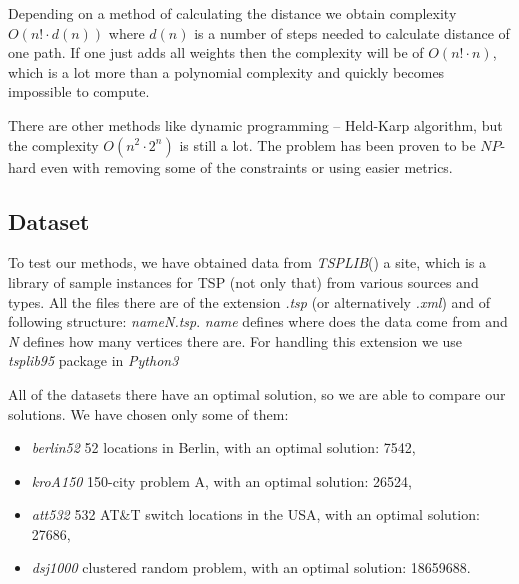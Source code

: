 	Depending on a method of calculating the distance we obtain complexity $O(n! \cdot d(n))$ where $d(n)$ is a number of steps needed to calculate distance of one path. If one just adds all weights then the complexity will be of $O(n! \cdot n)$, which is a lot more than a polynomial complexity and quickly becomes impossible to compute.
	
	There are other methods like dynamic programming -- Held-Karp algorithm, but the complexity $O(n^2 \cdot 2^n)$ is still a lot. The problem has been proven to be $NP$-hard even with removing some of the constraints or using easier metrics.

\subsection{Dataset}
	To test our methods, we have obtained data from \textit{TSPLIB}(\cite{TSPLIB8:online}) a site, which is a library of sample instances for TSP (not only that) from various sources and types. All the files there are of the extension \textit{.tsp} (or alternatively \textit{.xml}) and of following structure: \textit{nameN.tsp}. \textit{name} defines where does the data come from and \textit{N} defines how many vertices there are. For handling this extension we use \textit{tsplib95} package in \textit{Python3}
	
	All of the datasets there have an optimal solution, so we are able to compare our solutions. We have chosen only some of them:
	\begin{itemize}
		\item \textit{berlin52} 52 locations in Berlin, with an optimal solution: 7542,
		\item \textit{kroA150} 150-city problem A, with an optimal solution: 26524,
		\item \textit{att532} 532 AT\&T switch locations in the USA, with an optimal solution: 27686,
		\item \textit{dsj1000} clustered random problem, with an optimal solution: 18659688.
	\end{itemize}